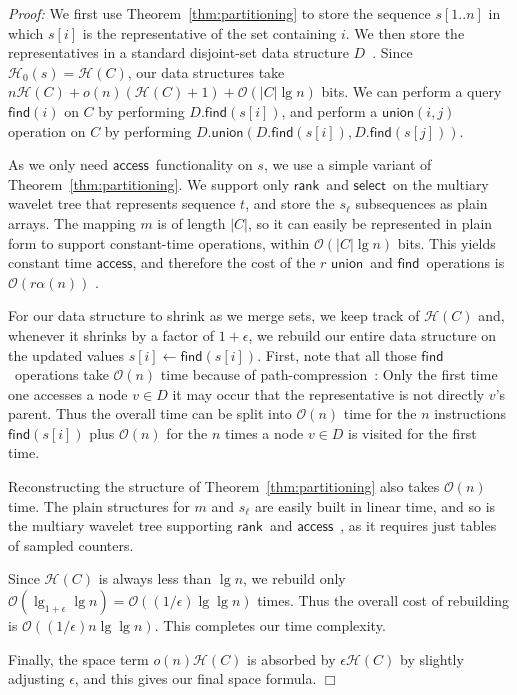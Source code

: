 \documentclass[11pt]{article}
\newenvironment{proof}{\textit{Proof:}}{\hfill$\Box$ \paragraph{} }
\newcommand{\Oh}[1]
    {\ensuremath{\mathcal{O}\left( {#1} \right)}}
\newcommand{\access}
    {\ensuremath{\mathsf{access}}}
\newcommand{\rank}
    {\ensuremath{\mathsf{rank}}}
\newcommand{\select}
    {\ensuremath{\mathsf{select}}}
\newcommand{\union}
    {\ensuremath{\mathsf{union}}}
\newcommand{\find}
    {\ensuremath{\mathsf{find}}}
\newcommand{\HH}{\mathcal{H}}
\newcommand{\Ho}{\HH_0}
\newcommand{\mapping}{\ensuremath{{m}}}
\begin{document}
\begin{proof}
We first use
Theorem~\ref{thm:partitioning} to store the sequence \(s [1..n]\) in which
\(s [i]\) is the representative of the set containing $i$.  We then store the 
representatives in a standard disjoint-set data structure $D$~\cite{TvL84}. 
Since $\Ho(s) = \HH(C)$, our data
structures take \(n \HH (C) + o (n)(\HH (C) + 1) + \Oh{|C| \lg n}\)
bits.  We can perform a query \(\find (i)\) on $C$ by performing
\(D.\find (s [i])\), and perform a \(\union (i, j)\)
operation on $C$ by performing \(D.\union(D.\find(s[i]), D.\find(s[j]))\).

As we only need \access\ functionality on $s$, we use a simple variant of
Theorem~\ref{thm:partitioning}. We support only \rank\ and \select\ on 
the multiary wavelet tree that represents sequence $t$, and store the $s_\ell$
subsequences as plain arrays. The mapping $\mapping$ is of length $|C|$, so it
can easily be represented in plain form to support constant-time operations,
within $\Oh{|C|\lg n}$ bits. This yields constant time $\access$, and therefore
the cost of the $r$ \union\ and \find\ operations is $\Oh{r \alpha(n)}$
\cite{TvL84}.

For our data structure to shrink as we merge sets, we keep
track of \(\HH (C)\) and, whenever it shrinks by a factor of \(1 +
\epsilon\), we rebuild our entire data structure on the updated values
$s[i] \leftarrow \find(s[i])$. First, note that all those \find\ operations
take $\Oh{n}$ time because of path-compression~\cite{TvL84}: Only the first
time one accesses a node $v\in D$ it may occur that the representative is not
directly $v$'s parent. Thus the overall time can be split into $\Oh{n}$ time
for the $n$ instructions $\find(s[i])$ plus $\Oh{n}$ for the $n$ times a node
$v \in D$ is visited for the first time.

Reconstructing the structure of Theorem~\ref{thm:partitioning} also takes 
$\Oh{n}$ time. The plain structures for $\mapping$ and $s_\ell$ are easily
built in linear time, and so is the multiary wavelet tree supporting \rank\ and
\access~\cite{FMMN07}, as it requires just tables of sampled counters.

Since \(\HH (C)\) is always less than \(\lg n\), we rebuild only 
$\Oh{\lg_{1+\epsilon} \lg n}=\Oh{(1/\epsilon)\lg\lg n}$ times. Thus the
overall cost of rebuilding is $\Oh{(1/\epsilon)n\lg\lg n}$. This completes
our time complexity.

Finally, the space term $o(n)\HH(C)$ is
absorbed by $\epsilon \HH(C)$ by slightly adjusting $\epsilon$, and
this gives our final space formula.
\end{proof}
\end{document}
